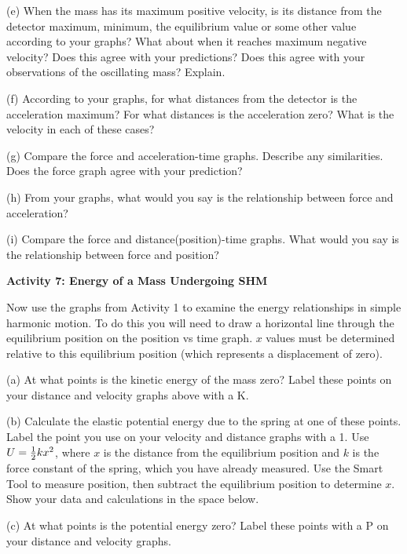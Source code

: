 (e) When the mass has its maximum positive velocity, is its distance from the
detector maximum, minimum, the equilibrium value or some other value according
to your graphs? What about when it reaches maximum negative velocity? Does this
agree with your predictions? Does this agree with your observations of the 
oscillating mass? Explain. 
\vspace{20mm}

(f) According to your graphs, for what distances from the detector is the 
acceleration maximum? For what distances is the acceleration zero? What is the 
velocity in each of these cases?
\vspace{20mm}

(g) Compare the force and acceleration-time graphs. Describe any similarities.
Does the force graph agree with your prediction?
\vspace{20mm}

(h) From your graphs, what would you say is the relationship between force and
acceleration? 
\vspace{20mm}

(i) Compare the force and distance(position)-time graphs. What would you say
is the relationship between force and position? 
\vspace{20mm}

\textbf{Activity 7: Energy of a Mass Undergoing SHM }

Now use the graphs from Activity 1 to examine the energy relationships
in simple harmonic motion. To do this you will need to draw a horizontal line through the equilibrium position on the position vs time graph.  $x$ values must be determined relative to this equilibrium position (which represents a displacement of zero).

(a) At what points is the kinetic energy of the mass zero? Label these points
on your distance and velocity graphs above with a K.

(b) Calculate the elastic potential energy due to the spring at one of these
points. Label the point you use on your velocity and distance graphs with a
1. Use $U = {1\over 2}kx^{2}$, where  $x$ is the distance from the equilibrium 
position and $k$ is the force constant of the spring, which you have already 
measured. Use the Smart Tool to measure position, then subtract the 
equilibrium position to determine $x$. Show your data and calculations 
in the space below. 
\vspace{25mm}

(c) At what points is the potential energy zero? Label these points with a P
on your distance and velocity graphs.

